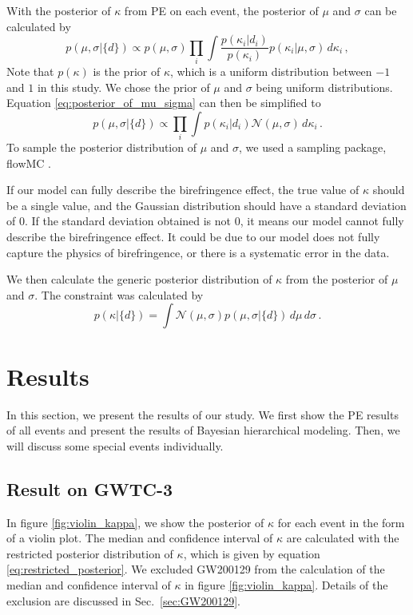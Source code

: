 \documentclass[aps,prd,twocolumn,superscriptaddress,preprintnumbers,floatfix,nofootinbib]{revtex4-2}
\begin{document}
With the posterior of $\kappa$ from PE on each event, the posterior of $\mu$ and $\sigma$ can be calculated by
\begin{equation}
    p(\mu,\sigma|\{d\})\propto p(\mu,\sigma)\prod_{i}\int\frac{p(\kappa_i|d_i)}{p(\kappa_i)}p(\kappa_i|\mu,\sigma)\,d\kappa_i\,,
    \label{eq:posterior_of_mu_sigma}
\end{equation}
Note that $p(\kappa)$ is the prior of $\kappa$, which is a uniform distribution between $-1$ and $1$ in this study.
We chose the prior of $\mu$ and $\sigma$ being uniform distributions.
Equation \ref{eq:posterior_of_mu_sigma} can then be simplified to
\begin{equation}
    p(\mu,\sigma|\{d\})\propto\prod_{i}\int p(\kappa_i|d_i)\mathcal{N}(\mu,\sigma)\,d\kappa_i\,.
\end{equation}
To sample the posterior distribution of $\mu$ and $\sigma$, we used a sampling package, flowMC \citep{flowMC}.

If our model can fully describe the birefringence effect, the true value of $\kappa$ should be a single value, and the Gaussian distribution should have a standard deviation of $0$.
If the standard deviation obtained is not $0$, it means our model cannot fully describe the birefringence effect.
It could be due to our model does not fully capture the physics of birefringence, or there is a systematic error in the data.

We then calculate the generic posterior distribution of $\kappa$ from the posterior of $\mu$ and $\sigma$.
The constraint was calculated by
\begin{equation}
    p(\kappa|\{d\})=\int \mathcal{N}(\mu,\sigma)p(\mu,\sigma|\{d\})\,d\mu\,d\sigma\,.
    \label{eq:generic_posterior}
\end{equation}

\section{Results}
\label{sec:Results}
In this section, we present the results of our study.
We first show the PE results of all events and present the results of Bayesian hierarchical modeling.
Then, we will discuss some special events individually.

\subsection{Result on GWTC-3}
In figure \ref{fig:violin_kappa}, we show the posterior of $\kappa$ for each event in the form of a violin plot.
The median and confidence interval of $\kappa$ are calculated with the restricted posterior distribution of $\kappa$, which is given by equation \ref{eq:restricted_posterior}.
We excluded GW200129 from the calculation of the median and confidence interval of $\kappa$ in figure \ref{fig:violin_kappa}.
Details of the exclusion are discussed in Sec.~\ref{sec:GW200129}.
\end{document}

